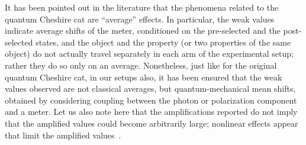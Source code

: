 \documentclass[aps,pra,showpacs,twoside,twocolumn,10pt]{revtex4-1}
\begin{document}
It has been pointed out in the literature that the phenomena related to the quantum Cheshire cat are ``average'' effects. 
In particular, the weak values indicate average shifts of the meter,
conditioned on the pre-selected and the post-selected states, and the object and the property (or two properties of the same object) do not actually travel separately in each arm of the experimental setup; rather they do so only on an average. 
Nonetheless, just like for the original quantum Cheshire cat, in our setups also, it has been ensured that the weak values observed are not classical averages, but quantum-mechanical mean shifts, obtained by considering coupling between the photon or polarization component and a meter. Let us also note here that the amplifications reported  do not imply that the amplified values could become arbitrarily large; nonlinear effects appear that limit the amplified values~\cite{Limits7}.\par %
%
%


\appendix
\end{document}
